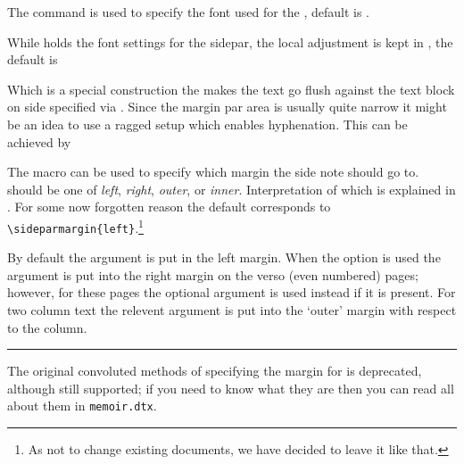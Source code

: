 The command \cmd{\sideparfont} is used to specify the font used for
the \cmd{\sidepar}, default is \cmd{\normalfont}\cmd{\normalsize}.

While \cmd{\sideparfont} holds the font settings for the sidepar, the
local adjustment is kept in \cmd{\sideparform}, the default is
\begin{lcode}
  \newcommand*{\sideparform}{%
    \ifmemtortm\raggedright\else\raggedleft\fi}
\end{lcode}
Which is a special construction the makes the text go flush against the
text block on side specified via \cmd{\sideparmargin}. Since the
margin par area is usually quite narrow it might be an idea to use a
ragged setup which enables hyphenation. This can be achieved by
\begin{lcode}
  \usepackage{ragged2e}
  \newcommand*{\sideparform}{%
    \ifmemtortm\RaggedRight\else\RaggedLeft\fi}
\end{lcode}


The macro \cmd{\sideparmargin} can be used to specify
which margin the side note should go to.  should be
one of \emph{left}, \emph{right}, \emph{outer}, or
\emph{inner}. Interpretation of which is explained in
. For some now forgotten reason the default
corresponds to \verb?\sideparmargin{left}?.\footnote{As not to change
  existing documents, we have decided to leave it like that.}


    By default the  argument is put in the 
left%
 margin. When
the  option is used the  argument is put into
the %
right 
margin on the verso (even numbered) pages; however, for these pages
the optional  argument is used instead if it is present. For
two column text the relevent argument is put into the `outer' margin with 
respect to the column.

\fancybreak{}

  The original convoluted
methods of specifying the margin for \cmd{\sidepar} is deprecated,
although still supported; if you need to know what they are then you
can read all about them in \texttt{memoir.dtx}.


